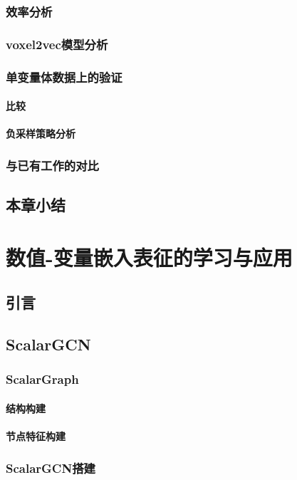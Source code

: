 \subsection{效率分析}
\subsection{voxel2vec模型分析}
\subsection{单变量体数据上的验证}
\subsubsection{比较}
\subsubsection{负采样策略分析}
\subsection{与已有工作的对比}
\section{本章小结}

\chapter{数值-变量嵌入表征的学习与应用}
\section{引言}
\section{ScalarGCN}
\subsection{ScalarGraph}
\subsubsection{结构构建}
\subsubsection{节点特征构建}
\subsection{ScalarGCN搭建}
